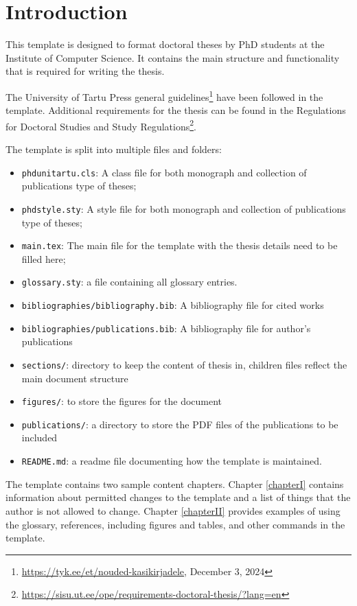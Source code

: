 \chapter{Introduction}

This template is designed to format doctoral theses by PhD students at the Institute of Computer Science. It contains the main structure and functionality that is required for writing the thesis.

The University of Tartu Press general guidelines\footnote{\url{https://tyk.ee/et/nouded-kasikirjadele}, December 3, 2024} have been followed in the template. Additional requirements for the thesis can be found in the Regulations for Doctoral Studies and Study Regulations\footnote{\url{https://sisu.ut.ee/ope/requirements-doctoral-thesis/?lang=en}}.

The template is split into multiple files and folders:

\begin{itemize}
\item \texttt{phdunitartu.cls}: A class file for both monograph and collection of publications type of theses;
\item \texttt{phdstyle.sty}: A style file for both monograph and collection of publications type of theses;
\item \texttt{main.tex}: The main file for the template with the thesis details need to be filled here;
\item \texttt{glossary.sty}: a file containing all glossary entries.
\item \texttt{bibliographies/bibliography.bib}: A bibliography file for cited works
\item \texttt{bibliographies/publications.bib}: A bibliography file for author's publications
\item \texttt{sections/}: directory to keep the content of thesis in, children files reflect the main document structure
\item \texttt{figures/}: to store the figures for the document
\item \texttt{publications/}: a directory to store the PDF files of the publications to be included
\item \texttt{README.md}: a readme file documenting how the template is maintained.
\end{itemize}

The template contains two sample content chapters. Chapter \ref{chapterI} contains information about permitted changes to the template and a list of things that the author is not allowed to change. Chapter \ref{chapterII} provides examples of using the glossary, references, including figures and tables, and other commands in the template.